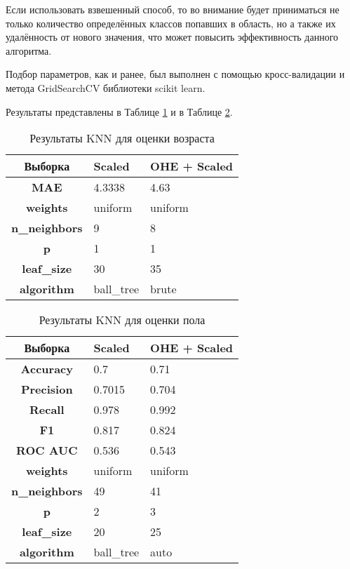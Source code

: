 Если использовать взвешенный способ, то во внимание будет приниматься не только количество определённых классов попавших в область, но а также их удалённость от нового значения, что может повысить эффективность данного алгоритма.

Подбор параметров, как и ранее, был выполнен с помощью кросс-валидации и метода GridSearchCV библиотеки scikit learn.

Результаты представлены в Таблице \ref{table5} и в Таблице \ref{table6}.

\setlength\extrarowheight{8pt}
\begin{table}[h!]
\centering
\begin{tabular}{|c|l|l|}
\hline
\textbf{Выборка}      & Scaled     & OHE + Scaled \\ \hline
\textbf{MAE}          & 4.3338     & 4.63         \\ \hline
\textbf{weights}      & uniform    & uniform      \\ \hline
\textbf{n\_neighbors} & 9          & 8            \\ \hline
\textbf{p}            & 1          & 1            \\ \hline
\textbf{leaf\_size}   & 30         & 35           \\ \hline
\textbf{algorithm}    & ball\_tree & brute        \\ \hline
\end{tabular}
\caption{Результаты KNN для оценки возраста}
\label{table5}
\end{table}

\setlength\extrarowheight{8pt}
\begin{table}[h!]
\centering
\begin{tabular}{|c|l|l|}
\hline
\textbf{Выборка}     & Scaled    & OHE + Scaled \\ \hline
\textbf{Accuracy}    & 0.7       & 0.71         \\ \hline
\textbf{Precision}   & 0.7015    & 0.704        \\ \hline
\textbf{Recall}      & 0.978     & 0.992        \\ \hline
\textbf{F1}          & 0.817     & 0.824        \\ \hline
\textbf{ROC AUC}     & 0.536     & 0.543        \\ \hline
\textbf{weights}     & uniform   & uniform      \\ \hline
\textbf{n\_neighbors} & 49        & 41           \\ \hline
\textbf{p}           & 2         & 3            \\ \hline
\textbf{leaf\_size}   & 20        & 25           \\ \hline
\textbf{algorithm}   & ball\_tree & auto         \\ \hline
\end{tabular}
\caption{Результаты KNN для оценки пола}
\label{table6}
\end{table}



